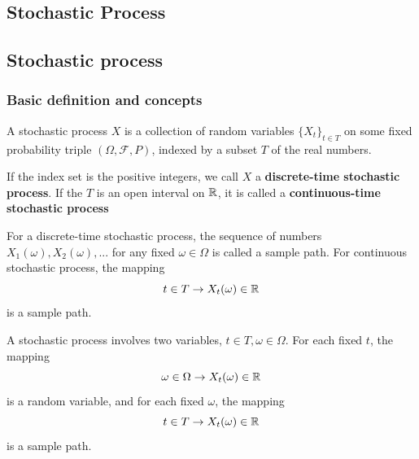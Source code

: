 
\begin{refsection}
\startcontents[chapters]	
\chapter{Stochastic Process}\label{ch:theory-of-stochastic-process}
\minitoc
	

\section{Stochastic process}

\subsection{Basic definition and concepts}
\begin{definition}\cite{dineen2013probability}
A stochastic process $X$ is a collection of random variables $\{X_t\}_{t\in T}$ on some fixed probability triple $(\Omega,\mathcal{F},P)$, indexed by a subset $T$ of the real numbers. 

If the index set is the positive integers, we call $X$ a \textbf{discrete-time stochastic process}. If the $T$ is an open interval on $\mathbb{R}$, it is called a \textbf{continuous-time stochastic process}

\end{definition}



\begin{definition}
\cite[45]{brzezniak1999basic} For a discrete-time stochastic process, the sequence of numbers $X_1(\omega),X_2(\omega),...$ for any fixed $\omega \in \Omega$ is called a sample path. For continuous stochastic process, the mapping $$t\in T \rightarrow X_t(\omega) \in \mathbb{R}$$
is a sample path. 
\end{definition}

\begin{remark}[interpretation]
	A stochastic process involves two variables, $t\in T,\omega \in \Omega$. For each fixed $t$, the mapping
	$$\omega \in \Omega \rightarrow X_t(\omega) \in \mathbb{R}$$
	is a random variable, and for each fixed $\omega$, the mapping $$t\in T \rightarrow X_t(\omega) \in \mathbb{R}$$
	is a sample path. 
\end{remark}


\end{refsection}
